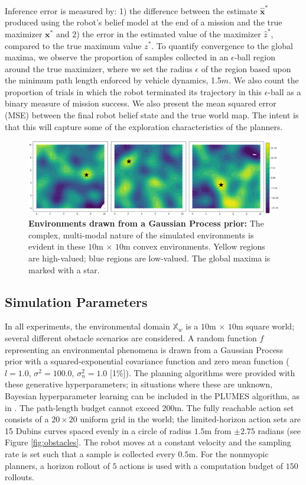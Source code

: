 \documentclass{styles/svproc}
\newcommand{\x}{\mathbf{x}}
\begin{document}
Inference error is measured by: 1) the difference between the estimate $\hat{\x}^*$ produced using the robot's belief model at the end of a mission and the true maximizer $\x^*$ and 2) the error in the estimated value of the maximizer $\hat{z}^*$, compared to the true maximum value $z^*$. To quantify convergence to the global maxima, we observe the proportion of samples collected in an $\epsilon$-ball region around the true maximizer, where we set the radius $\epsilon$ of the region based upon the minimum path length enforced by vehicle dynamics, 1.5$m$. We also count the proportion of trials in which the robot terminated its trajectory in this $\epsilon$-ball as a binary measure of mission success. We also present the mean squared error (MSE) between the final robot belief state and the true world map. The intent is that this will capture some of the exploration characteristics of the planners. 

\begin{figure}[t]
\centering
\includegraphics[width=\linewidth]{figures/3sims.png}\hfill
\caption{\textbf{Environments drawn from a Gaussian Process prior:} The complex, multi-modal nature of the simulated environments is evident in these $10$m $\times$ $10$m convex environments. Yellow regions are high-valued; blue regions are low-valued. The global maxima is marked with a star.}
\label{fig:freeworld}
\end{figure}

\subsection{Simulation Parameters}
In all experiments, the environmental domain $\mathbb{X}_w$ is a $10$m $\times$ $10$m square world; several different obstacle scenarios are considered. A random function $f$ representing an environmental phenomena is drawn from a Gaussian Process prior with a squared-exponential covariance function and zero mean function ($l = 1.0$, $\sigma^2 = 100.0$, $\sigma_n^2 = 1.0$ [1\%]). The planning algorithms were provided with these generative hyperparameters; in situations where these are unknown, Bayesian hyperparameter learning can be included in the PLUMES algorithm, as in \cite{wang2017max}. The path-length budget cannot exceed 200m. The fully reachable action set consists of a $20 \times 20$ uniform grid in the world; the limited-horizon action sets are 15 Dubins curves spaced evenly in a circle of radius $1.5$m from $\pm 2.75$ radians (see Figure \ref{fig:obstacles}. The robot moves at a constant velocity and the sampling rate is set such that a sample is collected every $0.5$m. For the nonmyopic planners, a horizon rollout of $5$ actions is used with a computation budget of $150$ rollouts. 
\end{document}
